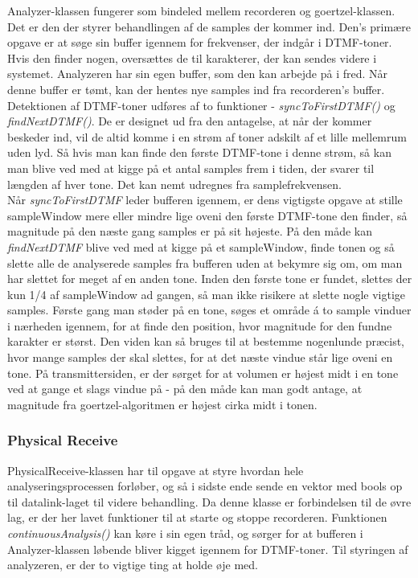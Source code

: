 Analyzer-klassen fungerer som bindeled mellem recorderen og goertzel-klassen. Det er den der styrer behandlingen af de samples der kommer ind. Den's primære opgave er at søge sin buffer igennem for frekvenser, der indgår i DTMF-toner. Hvis den finder nogen, oversættes de til karakterer, der kan sendes videre i systemet. Analyzeren har sin egen buffer, som den kan arbejde på i fred. Når denne buffer er tømt, kan der hentes nye samples ind fra recorderen's buffer. \\

Detektionen af DTMF-toner udføres af to funktioner - \textit{syncToFirstDTMF()} og \textit{findNextDTMF()}. De er designet ud fra den antagelse, at når der kommer beskeder ind, vil de altid komme i en strøm af toner adskilt af et lille mellemrum uden lyd. Så hvis man kan finde den første DTMF-tone i denne strøm, så kan man blive ved med at kigge på et antal samples frem i tiden, der svarer til længden af hver tone. Det kan nemt udregnes fra samplefrekvensen. \\

Når \textit{syncToFirstDTMF} leder bufferen igennem, er dens vigtigste opgave at stille sampleWindow mere eller mindre lige oveni den første DTMF-tone den finder, så magnitude på den næste gang samples er på sit højeste. På den måde kan \textit{findNextDTMF} blive ved med at kigge på et sampleWindow, finde tonen og så slette alle de analyserede samples fra bufferen uden at bekymre sig om, om man har slettet for meget af en anden tone. Inden den første tone er fundet, slettes der kun 1/4 af sampleWindow ad gangen, så man ikke risikere at slette nogle vigtige samples. Første gang man støder på en tone, søges et område á to sample vinduer i nærheden igennem, for at finde den position, hvor magnitude for den fundne karakter er størst. Den viden kan så bruges til at bestemme nogenlunde præcist, hvor mange samples der skal slettes, for at det næste vindue står lige oveni en tone. På transmittersiden, er der sørget for at volumen er højest midt i en tone ved at gange et slags vindue på - på den måde kan man godt antage, at magnitude fra goertzel-algoritmen er højest cirka midt i tonen.

\subsubsection{Physical Receive}

PhysicalReceive-klassen har til opgave at styre hvordan hele analyseringsprocessen forløber, og så i sidste ende sende en vektor med bools op til datalink-laget til videre behandling. Da denne klasse er forbindelsen til de øvre lag, er der her lavet funktioner til at starte og stoppe recorderen. Funktionen \textit{continuousAnalysis()} kan køre i sin egen tråd, og sørger for at bufferen i Analyzer-klassen løbende bliver kigget igennem for DTMF-toner. Til styringen af analyzeren, er der to vigtige ting at holde øje med.

